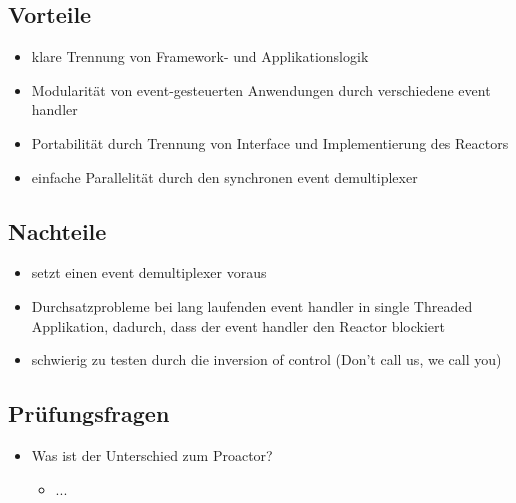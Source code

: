 \subsection{Vorteile}

\begin{itemize}
	\item klare Trennung von Framework- und Applikationslogik
	\item Modularität von event-gesteuerten Anwendungen durch verschiedene event handler
	\item Portabilität durch Trennung von Interface und Implementierung des Reactors
	\item einfache Parallelität durch den synchronen event demultiplexer
\end{itemize}


\subsection{Nachteile}

\begin{itemize}
	\item setzt einen event demultiplexer voraus
	\item Durchsatzprobleme bei lang laufenden event handler in single Threaded Applikation, dadurch, dass der event handler den Reactor blockiert
	\item schwierig zu testen durch die inversion of control (Don't call us, we call you)
\end{itemize}


\subsection{Prüfungsfragen}
\begin{itemize}
	\item Was ist der Unterschied zum Proactor?
	\begin{itemize}
		\item ...
	\end{itemize}
\end{itemize}
